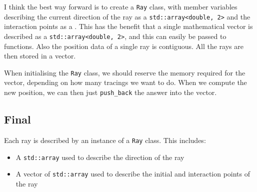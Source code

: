\documentclass{article}
\begin{document}
I think the best way forward is to create a \texttt{Ray} class, with member variables describing the current direction of the ray as a \texttt{std::array<double, 2>} and the interaction points as a . This has the benefit that a single mathematical vector is described as a \texttt{std::array<double, 2>}, and this can easily be passed to functions. Also the position data of a single ray is contiguous. All the rays are then stored in a vector.

When initialising the \texttt{Ray} class, we should reserve the memory required for the vector, depending on how many tracings we want to do. When we compute the new position, we can then just \texttt{push\_back} the answer into the vector.

\subsection{Final}
Each ray is described by an instance of a \texttt{Ray} class. This includes:
\begin{itemize}
    \item A \texttt{std::array} used to describe the direction of the ray
    \item A vector of \texttt{std::array} used to describe the initial and interaction points of the ray
\end{itemize}
\end{document}
